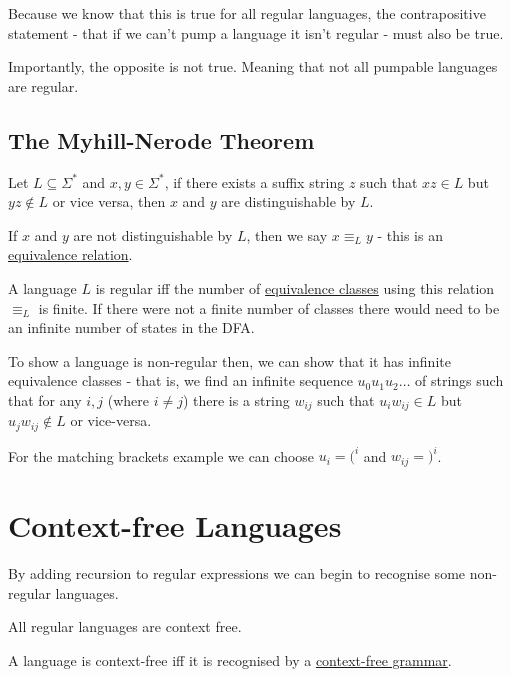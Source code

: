\documentclass{article}
\begin{document}
Because we know that this is true for all regular languages, the contrapositive statement - that if we can't pump a language it isn't regular - must also be true.

Importantly, the opposite is not true. Meaning that not all pumpable languages are regular.

\subsection{The Myhill-Nerode Theorem}\label{myhill-nerode}
Let $L \subseteq \Sigma^*$ and $x,y \in \Sigma^*$, if there exists a suffix string $z$ such that $xz \in L$ but $yz \not\in L$ or vice versa, then $x$ and $y$ are distinguishable by $L$.

If $x$ and $y$ are not distinguishable by $L$, then we say $x \equiv_L y$ - this is an \hyperref[equivalence-relation]{equivalence relation}.

A language $L$ is regular iff the number of \hyperref[equivalence-class]{equivalence classes} using this relation $\equiv_L$ is finite. If there were not a finite number of classes there would need to be an infinite number of states in the DFA.

To show a language is non-regular then, we can show that it has infinite equivalence classes - that is, we find an infinite sequence $u_0u_1u_2\dots$ of strings such that for any $i, j$ (where $i \neq j$) there is a string $w_{ij}$ such that $u_iw_{ij}\in L$ but $u_jw_{ij}\not \in L$ or vice-versa.

For the matching brackets example we can choose $u_i = (^i$ and $w_{ij}=)^i$.

\newpage

\section{Context-free Languages}\label{cfl}
By adding recursion to regular expressions we can begin to recognise some non-regular languages.

All regular languages are context free.

A language is context-free iff it is recognised by a \hyperref[cfg]{context-free grammar}.
\end{document}
